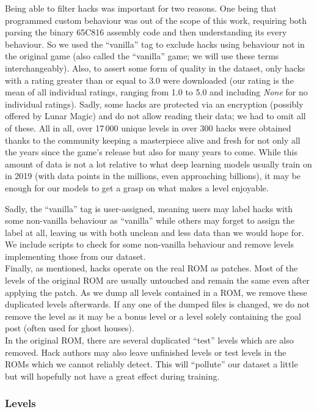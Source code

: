 Being able to filter hacks was important for two reasons. One being
that programmed custom behaviour was out of the scope of this work,
requiring both parsing the binary 65C816 assembly code and then
understanding its every behaviour. So we used the ``vanilla'' tag to
exclude hacks using behaviour not in the original game (also called
the ``vanilla'' game; we will use these terms interchangeably). 
Also, to assert some form of quality in the dataset, only hacks with a
rating greater than or equal to 3.0 were downloaded (our rating is the
mean of all individual ratings, ranging from 1.0 to 5.0 and including
\emph{None} for no individual ratings). Sadly, some hacks are
protected via an encryption (possibly offered by Lunar Magic) and do
not allow reading their data; we had to omit all of these. All in all,
over 17\,000 unique levels in over 300 hacks were obtained thanks to
the community keeping a masterpiece alive and fresh for not only all
the years since the game's release but also for many years to come.
While this amount of data is not a lot relative to what deep learning
models usually train on in 2019 (with data points in the millions,
even approaching billions), it may be enough for our models to get a
grasp on what makes a level enjoyable.

Sadly, the ``vanilla'' tag is user-assigned, meaning users may label
hacks with some non-vanilla behaviour as ``vanilla'' while others may
forget to assign the label at all, leaving us with both unclean and
less data than we would hope for. We include scripts to check for some
non-vanilla behaviour and remove levels implementing those from our
dataset. \\
Finally, as mentioned, hacks operate on the real ROM as patches. Most
of the levels of the original ROM are usually untouched and remain the
same even after applying the patch. As we dump all levels contained in
a ROM, we remove these duplicated levels afterwards. If any one of the
dumped files is changed, we do not remove the level as it may be a
bonus level or a level solely containing the goal post (often used for
ghost houses). \\
In the original ROM, there are several duplicated ``test'' levels
which are also removed. Hack authors may also leave unfinished levels
or test levels in the ROMs which we cannot reliably detect. This will
``pollute'' our dataset a little but will hopefully not have a great
effect during training.

\subsubsection{Levels}
\label{sec:levels}

